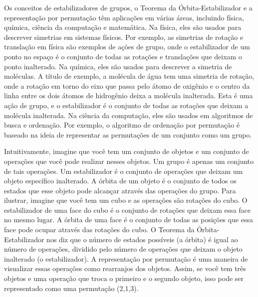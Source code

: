 \documentclass{article}
\begin{document}
  Os conceitos de estabilizadores de grupos, o Teorema da Órbita-Estabilizador e a representação por permutação têm aplicações em várias áreas, incluindo
  física, química, ciência da computação e matemática. 
  Na física, eles são usados para descrever simetrias em sistemas físicos. Por exemplo, as simetrias de rotação e translação em física são exemplos de ações de grupo, onde o estabilizador de um ponto no espaço é o conjunto de todas as rotações e translações que deixam o ponto inalterado.
  Na química, eles são usados para descrever a simetria de moléculas. A título de exemplo, a molécula de água tem uma simetria de rotação, onde a rotação em torno do eixo que passa pelo átomo de oxigênio e o centro da linha entre os dois átomos de hidrogênio deixa a molécula inalterada. Esta é uma ação de grupo, e o estabilizador é o conjunto de todas as rotações que deixam a molécula inalterada.
  Na ciência da computação, eles são usados em algoritmos de busca e ordenação. Por exemplo, o algoritmo de ordenação por permutação é baseado na ideia de representar as permutações de um conjunto como um grupo.

  Intuitivamente, imagine que você tem um conjunto de objetos e um conjunto de operações que você pode realizar nesses objetos. Um grupo é apenas um
  conjunto de tais operações. Um estabilizador é o conjunto de operações que deixam um objeto específico inalterado. A órbita de um objeto é o conjunto de
  todos os estados que esse objeto pode alcançar através das operações do grupo. Para ilustrar, imagine que você tem um cubo e as operações são rotações do cubo.
  O estabilizador de uma face do cubo é o conjunto de rotações que deixam essa face no mesmo lugar. 
  A órbita de uma face é o conjunto de todas as posições que essa face pode ocupar através das rotações do cubo. O Teorema da Órbita-Estabilizador nos diz que
  o número de estados possíveis (a órbita) é igual ao número de operações, dividido pelo número de operações que deixam o objeto inalterado (o estabilizador).
  A representação por permutação é uma maneira de visualizar essas operações como rearranjos dos objetos. Assim, se você tem três objetos e uma operação que troca
  o primeiro e o segundo objeto, isso pode ser representado como uma permutação (2,1,3).
\end{document}
